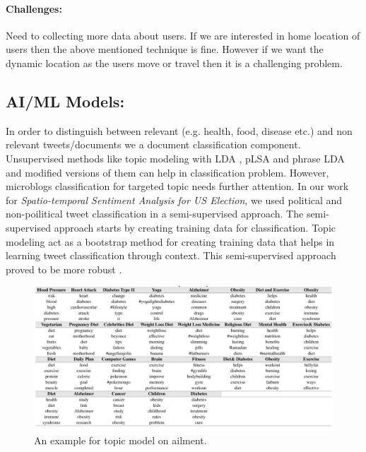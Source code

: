 \vspace{-2mm}
\paragraph{Challenges:}
Need to collecting more data about users. If we are interested in home location of users then the above mentioned \cite{compton2014geotagging} technique is fine. However if we want the dynamic location as the users move or travel then it is a challenging problem.


\subsection{AI/ML Models:}
In order to distinguish between relevant (e.g. health, food, disease etc.) and  non relevant tweets/documents we a document classification component. Unsupervised methods like topic modeling with LDA \cite{blei2003latent}, pLSA \cite{hofmann1999probabilistic} and phrase LDA \cite{el2014scalable} and modified versions of them can help in classification problem. However, microblogs classification for targeted topic needs further attention. In our work \cite{paul2017compass} for {\em Spatio-temporal Sentiment Analysis for US Election}, we used political and non-poilitical tweet classification in a semi-supervised approach. The semi-supervised approach starts by creating training data for classification. Topic modeling act as a bootstrap method for creating training data that helps in learning tweet classification through context. This semi-supervised approach proved to be more robust \cite{paul2017compass}.

\begin{figure}[t]
	\includegraphics[width=0.99\linewidth ]{fig/HealthTopicExample.png}
    \vspace{-2mm}
    \caption{An example for topic model on ailment\cite{paul2012model}.}
    \label{fig:energy_usage}
\end{figure}


